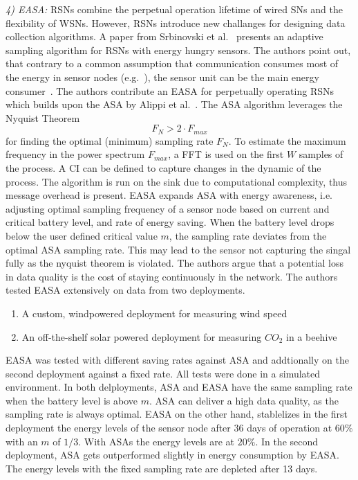 \textit{4) \ac{EASA}:}
\acp{RSN} combine the perpetual operation lifetime of wired \acp{SN} and the
flexibility of \acp{WSN}. However, \acp{RSN} introduce new challanges for
designing data collection algorithms. A paper from Srbinovski et
al.~\cite{srbinovski2016energy} presents an adaptive sampling algorithm for
\acp{RSN} with energy hungry sensors. The authors point out, that contrary to a
common assumption that communication consumes most of the energy in sensor
nodes (e.g.~\cite{santini2006adaptive}), the sensor unit can be the main energy
consumer~\cite{boyle2012energy}. The authors contribute an \ac{EASA} for
perpetually operating \acp{RSN} which builds upon the \ac{ASA} by Alippi et
al.~\cite{alippi2007adaptive}. The \ac{ASA} algorithm leverages the Nyquist
Theorem $$ F_N > 2 \cdot F_{max} $$ for finding the optimal (minimum) sampling
rate $ F_N $. To estimate the maximum frequency in the power spectrum $ F_{max}
$, a \ac{FFT} is used on the first $ W $ samples of the process. A \ac{CI} can
be defined to capture changes in the dynamic of the process. The algorithm is
run on the sink due to computational complexity, thus message overhead is
present. \ac{EASA} expands \ac{ASA} with energy awareness, i.e. adjusting
optimal sampling frequency of a sensor node based on current and critical
battery level, and rate of energy saving. When the battery level drops below
the user defined critical value $ m $, the sampling rate deviates from the
optimal \ac{ASA} sampling rate. This may lead to the sensor not capturing the
singal fully as the nyquist theorem is violated. The authors argue that a
potential loss in data quality is the cost of staying continuously in the
network. The authors tested \ac{EASA} extensively on data from two deployments.

\begin{enumerate}
    \item A custom, windpowered deployment for measuring wind speed
    \item An off-the-shelf solar powered deployment for measuring $ CO_2 $ in a beehive
\end{enumerate}

\ac{EASA} was tested with different saving rates against \ac{ASA} and
addtionally on the second deployment against a fixed rate. All tests were done
in a simulated environment. In both delployments, \ac{ASA} and \ac{EASA} have
the same sampling rate when the battery level is above $ m $. \ac{ASA} can
deliver a high data quality, as the sampling rate is always optimal. \ac{EASA}
on the other hand, stablelizes in the first deployment the energy levels of the
sensor node after 36 days of operation at $ 60\% $ with an $ m $ of $ 1/3 $.
With \acp{ASA} the energy levels are at $ 20\% $. In the second deployment,
\ac{ASA} gets outperformed slightly in energy consumption by \ac{EASA}. The
energy levels with the fixed sampling rate are depleted after 13 days.


